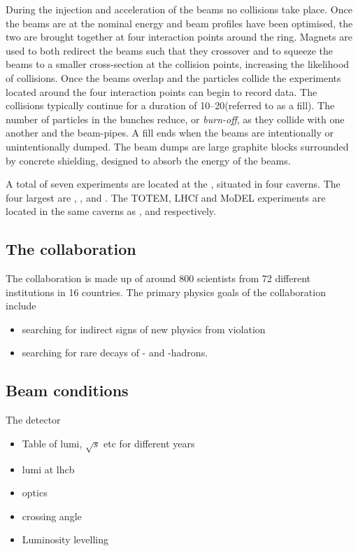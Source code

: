 During the injection and acceleration of the beams no collisions take place. Once the beams are at the nominal energy and beam profiles have been optimised, the two are brought together at four interaction points around the ring. Magnets are used to both redirect the beams such that they crossover and to squeeze the beams to a smaller cross-section at the collision points, increasing the likelihood of collisions. Once the beams overlap and the particles collide the experiments located around the four interaction points can begin to record data. The collisions typically continue for a duration of 10--20\hr (referred to as a fill). The number of particles in the bunches reduce, or \emph{burn-off}, as they collide with one another and the beam-pipes. A fill ends when the beams are intentionally or unintentionally dumped. The beam dumps are large graphite blocks surrounded by concrete shielding, designed to absorb the energy of the beams.  

A total of seven experiments are located at the \lhc, situated in four caverns. The four largest are \atlas, \cms, \lhcb and \alice. The TOTEM, LHCf and MoDEL experiments are located in the same caverns as \cms, \atlas and \lhcb respectively. 


\subsection{The \lhcb collaboration} 

The \lhcb collaboration is made up of around 800 scientists from 72 different institutions in 16 countries. The primary physics goals of the collaboration include
\begin{itemize}
\item searching for indirect signs of new physics from \CP violation
\item searching for rare decays of \bquark- and \cquark-hadrons. 
\end{itemize}  



\subsection{Beam conditions}


The \lhcb detector 


{\color{Red}
\begin{itemize}
\item Table of lumi, $\sqrt{s}$ etc for different years
\item lumi at lhcb
\item \lhc optics
\item crossing angle
\item Luminosity levelling
\end{itemize}
}


